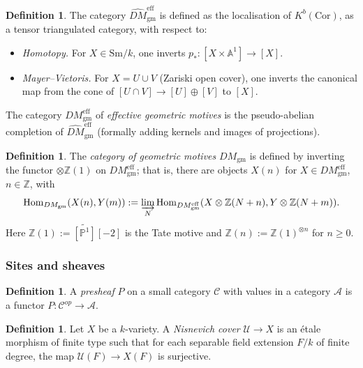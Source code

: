 \documentclass[12pt,a4paper]{article}
\theoremstyle{definition}
\newtheorem{definition}[theorem]{Definition}
\newcommand{\Sm}{\mathrm{Sm}}
\newcommand{\Cor}{\mathrm{Cor}}
\newcommand{\DMgm}{DM_{\mathrm{gm}}}
\newcommand{\DMeffgm}{\widehat{DM}^{\mathrm{eff}}_{\mathrm{gm}}}
\newcommand{\Hom}{\operatorname{Hom}}
\newcommand{\Z}{\mathbb{Z}}
\newcommand{\A}{\mathbb{A}}
\newcommand{\PP}{\mathbb{P}}
\begin{document}
\begin{definition}\label{def:DM-eff-gm}
The category $\DMeffgm$ is defined as the localisation of $K^b(\Cor)$, as a tensor
triangulated category, with respect to:
\begin{itemize}
  \item \textit{Homotopy.}  For $X\in\Sm/k$, one inverts
    $p_*:[X\times\A^1]\to[X]$.
  \item \textit{Mayer–Vietoris.}  For $X=U\cup V$ (Zariski open cover), one inverts
    the canonical map from the cone of $[U\cap V]\to[U]\oplus[V]$ to $[X]$.
\end{itemize}
The category $DM^{\mathrm{eff}}_{\mathrm{gm}}$ of \emph{effective geometric motives} is
the pseudo-abelian completion of $\DMeffgm$ (formally adding kernels and images of
projections).
\end{definition}

\begin{definition}\label{def:DM-gm}
The \emph{category of geometric motives} $\DMgm$ is defined by inverting the functor
$\otimes\Z(1)$ on $DM^{\mathrm{eff}}_{\mathrm{gm}}$; that is, there are objects $X(n)$
for $X\in DM^{\mathrm{eff}}_{\mathrm{gm}}$, $n\in\Z$, with
\[
  \Hom_{\DMgm}(X(n),Y(m)) :=
  \varinjlim_N \Hom_{DM^{\mathrm{eff}}_{\mathrm{gm}}}(X\otimes\Z(N+n),Y\otimes\Z(N+m)).
\]
Here $\Z(1):=\widetilde{[\PP^1]}[-2]$ is the Tate motive and
$\Z(n):=\Z(1)^{\otimes n}$ for $n\geq 0$.
\end{definition}

\subsubsection{Sites and sheaves}

\begin{definition}\label{def:presheaf}
A \emph{presheaf} $P$ on a small category $\mathcal{C}$ with values in a category
$\mathcal{A}$ is a functor $P:\mathcal{C}^{op}\to\mathcal{A}$.
\end{definition}

\begin{definition}\label{def:Nisnevich}
Let $X$ be a $k$-variety.  A \emph{Nisnevich cover} $\mathcal{U}\to X$ is an étale
morphism of finite type such that for each separable field extension $F/k$ of finite
degree, the map $\mathcal{U}(F)\to X(F)$ is surjective.
\end{definition}

\end{document}
